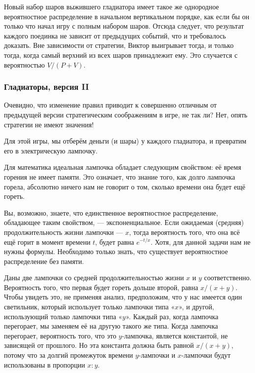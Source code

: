 Новый набор шаров выжившего гладиатора имеет такое же однородное вероятностное распределение в начальном вертикальном порядке, как если бы он только что начал игру с полным набором шаров.
Отсюда следует, что результат каждого поединка не зависит от предыдущих событий, что и требовалось доказать.
Вне зависимости от стратегии, Виктор выигрывает тогда, и только тогда, когда самый верхний из всех шаров принадлежит ему.
Это случается с вероятностью $V/(P+V)$.

\subsubsection*{Гладиаторы, версия II}%

Очевидно, что изменение правил приводит к совершенно отличным от предыдущей версии стратегическим соображениям в игре, не так ли? Нет, опять стратегии не имеют значения!

\medskip

Для этой игры, мы отберём деньги (и шары) у каждого гладиатора, и превратим его
в электрическую лампочку.

Для математика идеальная лампочка обладает следующим свойством: её время горения не имеет памяти.
Это означает, что знание того, как долго лампочка горела, абсолютно ничего нам не говорит о том, сколько времени она будет ещё гореть.

Вы, возможно, знаете, что единственное вероятностное распределение, обладающее таким свойством, --- экспоненциальное.
Если ожидаемая (средняя) продолжительность жизни лампочки --- $x$, тогда вероятность того, что она всё ещё горит в момент времени $t$, будет равна $e^{-t/x}$.
Хотя, для данной задачи нам не нужны формулы.
Необходимо только знать, что существует вероятностное распределение без памяти.

Даны две лампочки со средней продолжительностью жизни $x$ и $y$ соответственно.
Вероятность того, что первая будет гореть дольше второй, равна $x/(x+y)$.
Чтобы увидеть это, не применяя анализ, предположим, что у нас имеется один светильник, который использует только лампочки типа «$x$», и другой, использующий только лампочки типа «$y$».
Каждый раз, когда лампочка перегорает, мы заменяем её на другую такого же типа.
Когда лампочка перегорает, вероятность того, что это $y$-лампочка, является константой, не зависящей от прошлого.
Но эта константа должна быть равной $x/(x+y)$, потому что за долгий промежуток времени $y$-лампочки и $x$-лампочки будут использованы в пропорции $x : y$.

